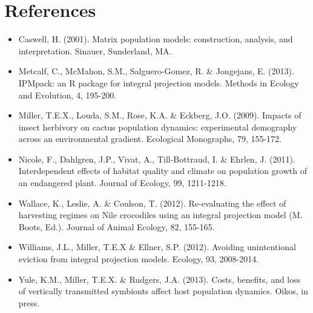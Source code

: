 \documentclass[11pt]{article}
\begin{document}
\section{References}
\begin{itemize}

\item Caswell, H. (2001). Matrix population models: construction, analysis, and interpretation. Sinauer, Sunderland, MA.

\item Metcalf, C., McMahon, S.M., Salguero-Gomez, R. \& Jongejans, E. (2013). IPMpack: an R package for integral projection models. Methods in Ecology and Evolution, 4, 195-200.

\item Miller, T.E.X., Louda, S.M., Rose, K.A. \& Eckberg, J.O. (2009). Impacts of insect herbivory on cactus population dynamics: experimental demography across an environmental gradient. Ecological Monographs, 79, 155-172.

\item Nicole, F., Dahlgren, J.P., Vivat, A., Till-Bottraud, I. \& Ehrlen, J. (2011). Interdependent effects of habitat quality and climate on population growth of an endangered plant. Journal of Ecology, 99, 1211-1218.

\item Wallace, K., Leslie, A. \& Coulson, T. (2012). Re-evaluating the effect of harvesting regimes on Nile crocodiles using an integral projection model (M. Boots, Ed.). Journal of Animal Ecology, 82, 155-165.

\item Williams, J.L., Miller, T.E.X \& Ellner, S.P. (2012). Avoiding unintentional eviction from integral projection models. Ecology, 93, 2008-2014.

\item Yule, K.M., Miller, T.E.X. \& Rudgers, J.A. (2013). Costs, benefits, and loss of vertically transmitted symbionts affect host population dynamics. Oikos, in press.

\end{itemize}
\end{document}
